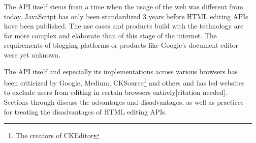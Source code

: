 The API itself stems from a time when the usage of the web was different from today. JavaScript has only been standardized 3 years before HTML editing APIs have been published. The use cases and products build with the technology are far more complex and elaborate than of this stage of the internet. The requirements of blogging platforms or products like Google's document editor were yet unknown. %

The API itself and especially its implementations across various browsers has been criticized by Google\cite{bw}, Medium\cite{medium_ce_terrible}, CKSource\cite{bj}\footnote{The creators of CKEditor} and others and has led websites to exclude users from editing in certain browsers entirely[citation needed]. Sections  through  discuss the advantages and disadvantages, as well as practices for treating the disadvantages of HTML editing APIs.









